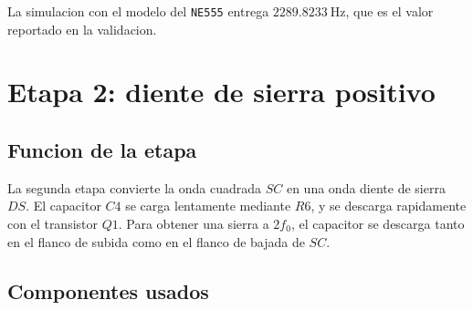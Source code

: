 ﻿\documentclass[11pt,letterpaper]{article}
\begin{document}
La simulacion con el modelo del \texttt{NE555} entrega
\(2289.8233~\text{Hz}\), que es el valor reportado en la validacion.

\section{Etapa 2: diente de sierra positivo}

\subsection{Funcion de la etapa}

La segunda etapa convierte la onda cuadrada \(SC\) en una onda diente de
sierra \(DS\). El capacitor \(C4\) se carga lentamente mediante \(R6\), y se
descarga rapidamente con el transistor \(Q1\). Para obtener una sierra a
\(2f_0\), el capacitor se descarga tanto en el flanco de subida como en el
flanco de bajada de \(SC\).

\subsection{Componentes usados}
\end{document}
